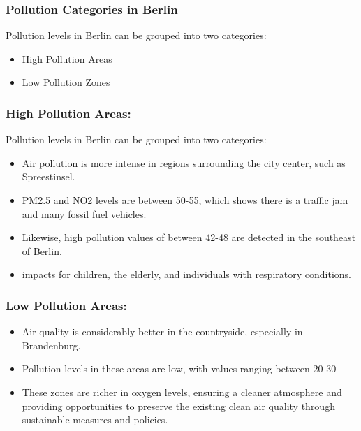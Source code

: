 \subsubsection{Pollution Categories in Berlin}\label{sec:43}
Pollution levels in Berlin can be grouped into two categories: 
\begin{itemize}
    \item High Pollution Areas 
    \item Low Pollution Zones
\end{itemize}
\subsubsection{High Pollution Areas:}\label{sec:43}
Pollution levels in Berlin can be grouped into two categories: 
\begin{itemize}
    \item Air pollution is more intense in regions surrounding the city center, such as Spreestinsel.	
    \item PM2.5 and NO2 levels are between 50-55, which shows there is a traffic jam and many fossil fuel vehicles.
    \item Likewise, high pollution values of between 42-48 are detected in the southeast of Berlin.
    \item impacts for children, the elderly, and individuals with respiratory conditions.
\end{itemize}

\subsubsection{Low Pollution Areas:}\label{sec:43}
\begin{itemize}
    \item Air quality is considerably better in the countryside, especially in Brandenburg.
    \item Pollution levels in these areas are low, with values ranging between 20-30%
    \item These zones are richer in oxygen levels, ensuring a cleaner atmosphere and providing opportunities to preserve the existing clean air quality through sustainable measures and policies.
\end{itemize}
